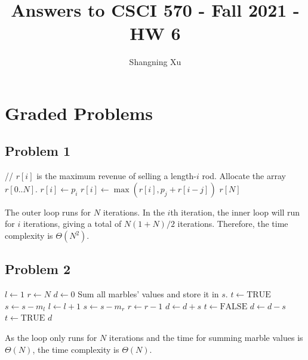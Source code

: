 \documentclass{article}
\title{Answers to CSCI 570 - Fall 2021 - HW 6}
\author{Shangning Xu}
\begin{document}
\maketitle

\section*{Graded Problems}

\subsection*{Problem 1}

\begin{algorithmic}[1]
    \State // $r[i]$ is the maximum revenue of selling a length-$i$ rod.
    \State Allocate the array $r[0..N]$.
        \State $r[i] \gets p_i$
            \State $r[i] \gets \max(r[i], p_j + r[i - j])$
        \EndFor
    \EndFor
    \State \Return $r[N]$
\end{algorithmic}

The outer loop runs for $N$ iterations. In the $i$th iteration, the inner loop will run for $i$ iterations, giving a total of $N(1 + N)/2$ iterations. Therefore, the time complexity is $\Theta(N^2)$.

\subsection*{Problem 2}

\begin{algorithmic}[1]
    \State $l \gets 1$
    \State $r \gets N$
    \State $d \gets 0$ 
    \State Sum all marbles' values and store it in $s$.
    \State $t \gets \mathrm{TRUE}$ 
         
            \State $s \gets s - m_l$
            \State $l \gets l + 1$
        \Else
            \State $s \gets s - m_r$
            \State $r \gets r - 1$
        \EndIf
            \State $d \gets d + s$
            \State $t \gets \mathrm{FALSE}$
        \Else
            \State $d \gets d - s$
            \State $t \gets \mathrm{TRUE}$
        \EndIf
    \EndWhile
    \State \Return $d$
\end{algorithmic}

As the loop only runs for $N$ iterations and the time for summing marble values is $\Theta(N)$, the time complexity is $\Theta(N)$.
\end{document}
